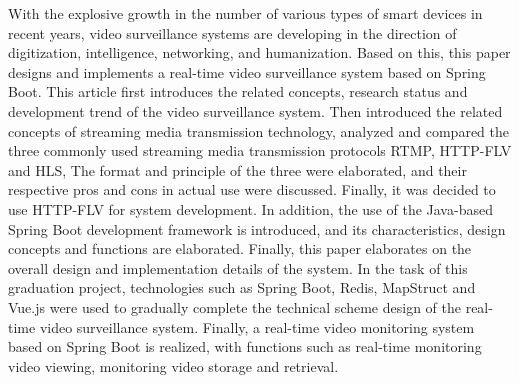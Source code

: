 \begin{enabstract}
  With the explosive growth in the number of various types of smart devices in recent years, 
  video surveillance systems are developing in the direction of digitization, intelligence,
   networking, and humanization.
  Based on this, this paper designs and implements a real-time video surveillance system based on Spring Boot.
  This article first introduces the related concepts, research status and development trend of 
  the video surveillance system.
  Then introduced the related concepts of streaming media transmission technology, 
  analyzed and compared the three commonly used streaming media transmission protocols RTMP, HTTP-FLV and HLS,
   The format and principle of the three were elaborated, and their respective pros and cons in actual use were discussed.
    Finally, it was decided to use HTTP-FLV for system development.
    In addition, the use of the Java-based Spring Boot development framework is introduced, and its characteristics,
     design concepts and functions are elaborated.
    Finally, this paper elaborates on the overall design and implementation details of the system.
  In the task of this graduation project, technologies such as Spring Boot, Redis,
   MapStruct and Vue.js were used to gradually complete the technical scheme design 
   of the real-time video surveillance system.
  Finally, a real-time video monitoring system based on Spring Boot is realized, 
  with functions such as real-time monitoring video viewing, monitoring video storage and retrieval.

\end{enabstract}
